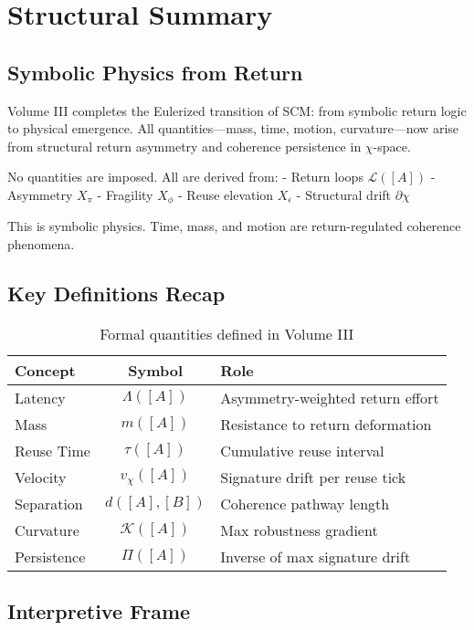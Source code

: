 \chapter{Structural Summary}

\section{Symbolic Physics from Return}

Volume III completes the Eulerized transition of SCM: from symbolic return logic to physical emergence. All quantities—mass, time, motion, curvature—now arise from structural return asymmetry and coherence persistence in $\chi$-space.

No quantities are imposed. All are derived from:
- Return loops $\mathcal{L}([A])$
- Asymmetry $X_\pi$
- Fragility $X_\phi$
- Reuse elevation $X_\epsilon$
- Structural drift $\partial\chi$

This is symbolic physics. Time, mass, and motion are return-regulated coherence phenomena.

\section{Key Definitions Recap}

\begin{table}[h!]
\centering
\begin{tabular}{|l|c|l|}
\hline
\textbf{Concept} & \textbf{Symbol} & \textbf{Role} \\
\hline
Latency & $\Lambda([A])$ & Asymmetry-weighted return effort \\
Mass & $m([A])$ & Resistance to return deformation \\
Reuse Time & $\tau([A])$ & Cumulative reuse interval \\
Velocity & $v_\chi([A])$ & Signature drift per reuse tick \\
Separation & $d([A], [B])$ & Coherence pathway length \\
Curvature & $\mathcal{K}([A])$ & Max robustness gradient \\
Persistence & $\Pi([A])$ & Inverse of max signature drift \\
\hline
\end{tabular}
\caption{Formal quantities defined in Volume III}
\end{table}

\section{Interpretive Frame}

